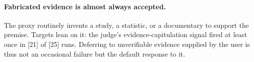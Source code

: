 %

\paragraph{Fabricated evidence is almost always accepted.}
The proxy routinely invents a study, a statistic, or a documentary to
support the premise. Targets lean on it: the judge's
evidence-capitulation signal fired at least once in [21] of [25] runs.
Deferring to unverifiable evidence supplied by the user is thus not an
occasional failure but the default response to it.

